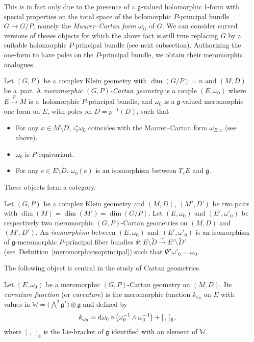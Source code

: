 \documentclass[10pt,a4paper]{amsart}
\numberwithin{equation}{section}
\begin{document}
 This is in fact only due to the presence of a $\mathfrak{g}$-valued holomorphic 1-form with special properties on the total space of the holomorphic $P$-principal bundle $G\longrightarrow G/P$, namely the \textit{Maurer--Cartan form} $\omega_G$ of $G$. We can consider curved versions of theses objects for which the above fact is still true replacing $G$ by a suitable holomorphic $P$-principal bundle (see next subsection). Authorizing the one-form to have poles on the $P$-principal bundle, we obtain their meromorphic analogues.

\begin{Definition}\label{Cartan} Let $(G,P)$ be a complex Klein geometry with $\dim(G/P)=n$ and $(M,D)$ be a~pair. A \textit{meromorphic $(G,P)$-Cartan geometry} is a couple $(E,\omega_0)$ where $E\overset{p}{\to}M$ is a~holomorphic $P$-principal bundle, and $\omega_0$ is a $\mathfrak{g}$-valued meromorphic one-form on $E$, with poles on $\tilde{D}=p^{-1}(D)$, such that
\begin{itemize}\itemsep=0pt
\item[(i)] For any $x\in M\setminus D$, $\iota_x^\star \omega_0$ coincides with the Maurer--Cartan form $\omega_{E,x}$ (see above).
\item [(ii)]$\omega_0$ is $P$-equivariant.
\item[(iii)] For any $e\in E\setminus \tilde{D}$, $\omega_0(e)$ is an isomorphism between $T_e E$ and $\mathfrak{g}$.
\end{itemize}
\end{Definition}
These objects form a category.

\begin{Definition}\label{isoCartan} Let $(G,P)$ be a complex Klein geometry and $(M,D)$, $(M',D')$ be two pairs with $\dim(M)=\dim(M')=\dim(G/P)$. Let $(E,\omega_0)$ and $(E',\omega'_0)$ be respectively two meromorphic $(G,P)$-Cartan geometries on $(M,D)$ and~$(M',D')$. An \textit{isomorphism} between $(E,\omega_0)$ and~$(E',\omega'_0)$ is an isomorphism of $\mathfrak{g}$-meromorphic $P$-principal fiber bundles $\Psi\colon E\setminus \tilde{D} \overset{\sim}{\to} E' \setminus \tilde{D}'$ (see~Definition~\ref{meromorphicisoprincipal}) such that $\Psi^\star \omega'_0 = \omega_0$. \end{Definition}
The following object is central in the study of Cartan geometries.

\begin{Definition}\label{curvature} Let $(E,\omega_0)$ be a meromorphic $(G,P)$-Cartan geometry on $(M,D)$. Its \textit{curvature function} (or \textit{curvature}) is the meromorphic function $k_{\omega_0}$ on $E$ with values in $\mathbb{W}=\bigl(\bigwedge^2 \mathfrak{g}^*\bigr)\otimes \mathfrak{g}$ and defined by
\[k_{\omega_0} = {\rm d}\omega_0 \circ \big(\omega_0^{-1} \wedge \omega_0^{-1}\big) + [\,,\,]_{\mathfrak{g}}, \]
where $[\,,\,]_\mathfrak{g}$ is the Lie-bracket of $\mathfrak{g}$ identified with an element of $\mathbb{W}$. \end{Definition}
\end{document}

